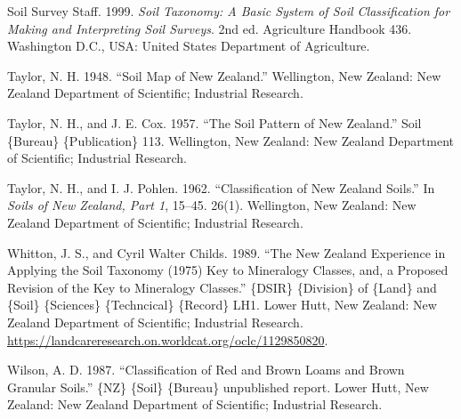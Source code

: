 \documentclass[
  letterpaper,
  DIV=11,
  numbers=noendperiod]{scrreprt}
\newlength{\cslhangindent}
\newlength{\cslentryspacingunit} %
\newenvironment{CSLReferences}[2] %
 {%
  \setlength{\parindent}{0pt}
  \ifodd #1
  \let\oldpar\par
  \def\par{\hangindent=\cslhangindent\oldpar}
  \fi
  \setlength{\parskip}{#2\cslentryspacingunit}
 }%
 {}
\begin{document}
\begin{CSLReferences}{1}{0}
\leavevmode{}%
Soil Survey Staff. 1999. \emph{Soil {Taxonomy}: {A} Basic System of
{Soil} {Classification} for {Making} and {Interpreting} {Soil}
{Surveys}}. 2nd ed. Agriculture {Handbook} 436. Washington D.C., USA:
United States Department of Agriculture.

\leavevmode{}%
Taylor, N. H. 1948. {``Soil {Map} of {New} {Zealand}.''} Wellington, New
Zealand: New Zealand Department of Scientific; Industrial Research.

\leavevmode{}%
Taylor, N. H., and J. E. Cox. 1957. {``The {Soil} {Pattern} of {New}
{Zealand}.''} Soil \{Bureau\} \{Publication\} 113. Wellington, New
Zealand: New Zealand Department of Scientific; Industrial Research.

\leavevmode{}%
Taylor, N. H., and I. J. Pohlen. 1962. {``Classification of {New}
{Zealand} {Soils}.''} In \emph{Soils of {New} {Zealand}, {Part} 1},
15--45. 26(1). Wellington, New Zealand: New Zealand Department of
Scientific; Industrial Research.

\leavevmode{}%
Whitton, J. S., and Cyril Walter Childs. 1989. {``The {New} {Zealand}
Experience in Applying the {Soil} Taxonomy (1975) Key to Mineralogy
Classes, and, a Proposed Revision of the {Key} to Mineralogy Classes.''}
\{DSIR\} \{Division\} of \{Land\} and \{Soil\} \{Sciences\}
\{Techncical\} \{Record\} LH1. Lower Hutt, New Zealand: New Zealand
Department of Scientific; Industrial Research.
\url{https://landcareresearch.on.worldcat.org/oclc/1129850820}.

\leavevmode{}%
Wilson, A. D. 1987. {``Classification of Red and Brown Loams and Brown
Granular Soils.''} \{NZ\} \{Soil\} \{Bureau\} unpublished report. Lower
Hutt, New Zealand: New Zealand Department of Scientific; Industrial
Research.

\end{CSLReferences}
\end{document}
